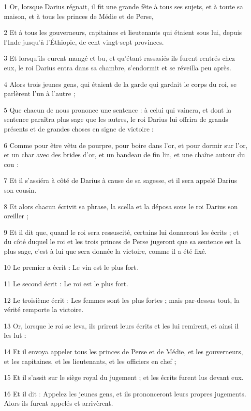 \par 1 Or, lorsque Darius régnait, il fit une grande fête à tous ses sujets, et à toute sa maison, et à tous les princes de Médie et de Perse,
\par 2 Et à tous les gouverneurs, capitaines et lieutenants qui étaient sous lui, depuis l'Inde jusqu'à l'Éthiopie, de cent vingt-sept provinces.
\par 3 Et lorsqu'ils eurent mangé et bu, et qu'étant rassasiés ils furent rentrés chez eux, le roi Darius entra dans sa chambre, s'endormit et se réveilla peu après.
\par 4 Alors trois jeunes gens, qui étaient de la garde qui gardait le corps du roi, se parlèrent l'un à l'autre ;
\par 5 Que chacun de nous prononce une sentence : à celui qui vaincra, et dont la sentence paraîtra plus sage que les autres, le roi Darius lui offrira de grands présents et de grandes choses en signe de victoire :
\par 6 Comme pour être vêtu de pourpre, pour boire dans l'or, et pour dormir sur l'or, et un char avec des brides d'or, et un bandeau de fin lin, et une chaîne autour du cou :
\par 7 Et il s'assiéra à côté de Darius à cause de sa sagesse, et il sera appelé Darius son cousin.
\par 8 Et alors chacun écrivit sa phrase, la scella et la déposa sous le roi Darius son oreiller ;
\par 9 Et il dit que, quand le roi sera ressuscité, certains lui donneront les écrits ; et du côté duquel le roi et les trois princes de Perse jugeront que sa sentence est la plus sage, c'est à lui que sera donnée la victoire, comme il a été fixé.
\par 10 Le premier a écrit : Le vin est le plus fort.
\par 11 Le second écrit : Le roi est le plus fort.
\par 12 Le troisième écrit : Les femmes sont les plus fortes ; mais par-dessus tout, la vérité remporte la victoire.
\par 13 Or, lorsque le roi se leva, ils prirent leurs écrits et les lui remirent, et ainsi il les lut :
\par 14 Et il envoya appeler tous les princes de Perse et de Médie, et les gouverneurs, et les capitaines, et les lieutenants, et les officiers en chef ;
\par 15 Et il s'assit sur le siège royal du jugement ; et les écrits furent lus devant eux.
\par 16 Et il dit : Appelez les jeunes gens, et ils prononceront leurs propres jugements. Alors ils furent appelés et arrivèrent.
